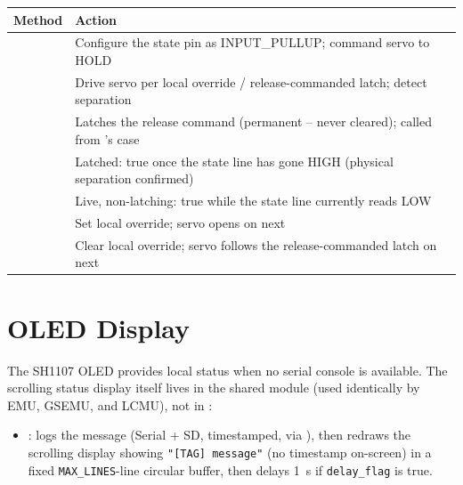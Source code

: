 ﻿\documentclass[11pt,letterpaper]{article}
\begin{document}
\begin{center}
\begin{tabularx}{\textwidth}{@{}lY@{}}
\toprule
Method & Action \\
\midrule
{}                & Configure the state pin as INPUT\_PULLUP; command servo to HOLD \\
                & Drive servo per local override / release-commanded latch; detect separation \\
        & Latches the release command (permanent -- never cleared); called from 's  case \\
           & Latched: true once the state line has gone HIGH (physical separation confirmed) \\
  & Live, non-latching: true while the state line currently reads LOW \\
          & Set local override; servo opens on next  \\
             & Clear local override; servo follows the release-commanded latch on next  \\
\bottomrule
\end{tabularx}
\end{center}

\section{OLED Display}

The SH1107 OLED provides local status when no serial console is available.
The scrolling status display itself lives in the shared
 module (used identically by EMU, GSEMU, and
LCMU), not in :

\begin{itemize}[nosep]
  \item {}: logs the
        message (Serial + SD, timestamped, via ), then
        redraws the scrolling display showing \texttt{"[TAG] message"}
        (no timestamp on-screen) in a fixed \texttt{MAX\_LINES}-line
        circular buffer, then delays 1~s if \texttt{delay\_flag} is true.
\end{itemize}
\end{document}
